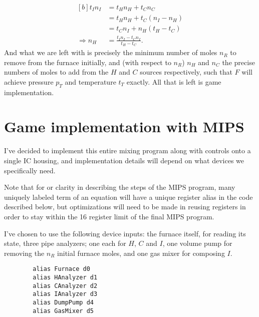 \documentclass{article}
\begin{document}
\begin{equation}\label{eq:nH}
    \begin{aligned}[b]
        t_I n_I
        &= t_H n_H+t_C n_C \\
        &= t_H n_H+t_C(n_I-n_H) \\
        &= t_C n_I+n_H(t_H-t_C) \\
        \Rightarrow n_H &= \frac{t_I n_I-t_C n_I}{t_H-t_C}.
    \end{aligned}
\end{equation}
And what we are left with is precisely the minimum number of moles $n_R$ to
remove from the furnace initially, and (with respect to $n_R$) $n_H$ and $n_C$
the precise numbers of moles to add from the $H$ and $C$ sources respectively,
such that $F$ will achieve pressure $p_T$ and temperature $t_T$ exactly.
All that is left is game implementation.

\pagebreak

\section{Game implementation with MIPS}

I've decided to implement this entire mixing program along with controls onto a
single IC housing, and implementation details will depend on what devices we
specifically need.

Note that for or clarity in describing the steps of the MIPS program,
many uniquely labeled term of an equation will have a unique register alias
in the code described below, but optimizations will need to be made in
reusing registers in order to stay within the 16 register limit of the
final MIPS program.
\vspace{1em}
\begin{paracol}{2}
    \noindent
    I've chosen to use the following device inputs:
    the furnace itself, for reading its state,
    three pipe analyzers; one each for $H$, $C$ and $I$,
    one volume pump for removing the $n_R$ initial furnace moles, and
    one gas mixer for composing $I$.
    \switchcolumn
    \vspace{-1em}
    \begin{verbatim}
        alias Furnace d0
        alias HAnalyzer d1
        alias CAnalyzer d2
        alias IAnalyzer d3
        alias DumpPump d4
        alias GasMixer d5
    \end{verbatim}
\end{paracol}
\end{document}
